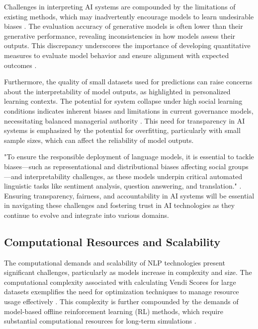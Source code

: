 Challenges in interpreting AI systems are compounded by the limitations of existing methods, which may inadvertently encourage models to learn undesirable biases \cite{shakarian2022reasoningcomplexnetworkslogic}. The evaluation accuracy of generative models is often lower than their generative performance, revealing inconsistencies in how models assess their outputs. This discrepancy underscores the importance of developing quantitative measures to evaluate model behavior and ensure alignment with expected outcomes \cite{lin2023interpretabilityframeworksimilarcase}.



Furthermore, the quality of small datasets used for predictions can raise concerns about the interpretability of model outputs, as highlighted in personalized learning contexts. The potential for system collapse under high social learning conditions indicates inherent biases and limitations in current governance models, necessitating balanced managerial authority \cite{chen2024adaptivenetworkinterventioncomplex}. This need for transparency in AI systems is emphasized by the potential for overfitting, particularly with small sample sizes, which can affect the reliability of model outputs.



"To ensure the responsible deployment of language models, it is essential to tackle biases—such as representational and distributional biases affecting social groups—and interpretability challenges, as these models underpin critical automated linguistic tasks like sentiment analysis, question answering, and translation." \cite{chowdhery2023palm,magee2021intersectionalbiascausallanguage}. Ensuring transparency, fairness, and accountability in AI systems will be essential in navigating these challenges and fostering trust in AI technologies as they continue to evolve and integrate into various domains.



\subsection{Computational Resources and Scalability} \label{subsec:Computational Resources and Scalability}

The computational demands and scalability of NLP technologies present significant challenges, particularly as models increase in complexity and size. The computational complexity associated with calculating Vendi Scores for large datasets exemplifies the need for optimization techniques to manage resource usage effectively \cite{pasarkar2024cousinsvendiscorefamily}. This complexity is further compounded by the demands of model-based offline reinforcement learning (RL) methods, which require substantial computational resources for long-term simulations \cite{wang2023environmenttransformerpolicyoptimization}.



